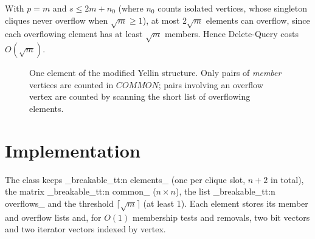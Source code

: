 \documentclass[11pt,a4paper,oneside]{report}
\theoremstyle{plain}
\theoremstyle{definition}
\theoremstyle{remark}
\newcommand{\op}[1]{\textsf{#1}}
\DeclareRobustCommand{\code}[1]{\mtp_breakable_tt:n {#1}}
\begin{document}
With \(p=m\) and \(s\le 2m+n_0\) (where \(n_0\) counts isolated vertices, whose singleton cliques
never overflow when \(\sqrt m\ge 1\)), at most \(2\sqrt m\) elements can overflow, since each
overflowing element has at least \(\sqrt m\) members. Hence \op{Delete-Query} costs
\(O(\sqrt m)\).

\begin{figure}[ht]
\centering
{}
\caption[The modified Yellin structure]{One element of the modified Yellin structure. Only
pairs of \emph{member} vertices are counted in \(\mathit{COMMON}\); pairs involving an overflow
vertex are counted by scanning the short list of overflowing elements.}
\label{fig:yellin}
\end{figure}

\section{Implementation}
The class keeps \code{elements_} (one per clique slot, \(n+2\) in total), the matrix
\code{common_} (\(n\times n\)), the list \code{overflows_} and the threshold
\(\lceil\sqrt m\rceil\) (at least 1). Each element stores its member and overflow lists and,
for \(O(1)\) membership tests and removals, two bit vectors and two iterator vectors indexed by
vertex.
\end{document}
